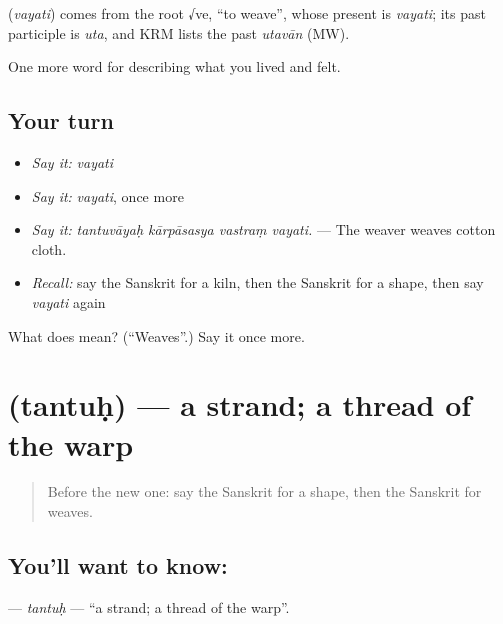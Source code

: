\begin{cousinweb}
\textbf{} (\emph{vayati}) comes from the root √ve, \textquotedblleft{}to weave\textquotedblright{}, whose present is \emph{vayati}; its past participle is \emph{uta}, and KRM lists the past \emph{utavān} (MW).
\end{cousinweb}

\begin{grammarlens}[title={What you've built}]
One more word for describing what you lived and felt.
\end{grammarlens}

\subsection*{Your turn}
\begin{itemize}
\raggedright
  \item \emph{Say it:} \emph{vayati}
  \item \emph{Say it:} \emph{vayati}, once more
  \item \emph{Say it:} \emph{tantuvāyaḥ kārpāsasya vastraṃ vayati.} — The weaver weaves cotton cloth.
  \item \emph{Recall:} say the Sanskrit for a kiln, then the Sanskrit for a shape, then say \emph{vayati} again
\end{itemize}

\begin{tcolorbox}[breakable,colback=teal!4,colframe=teal!35!black,title={Before you move on}]
What does  mean? (\textquotedblleft{}Weaves\textquotedblright{}.) Say it once more.
\end{tcolorbox}
\section[\texorpdfstring{\sk{तन्तुः} (tantuḥ)}{तन्तुः (tantuḥ)}]{ (tantuḥ) — a strand; a thread of the warp}

\label{lesson:SA-C506-tantuh}



\begin{quote}
Before the new one: say the Sanskrit for a shape, then the Sanskrit for weaves.
\end{quote}

\subsection*{You'll want to know: }
\textbf{} — \emph{tantuḥ} — \textquotedblleft{}a strand; a thread of the warp\textquotedblright{}.

